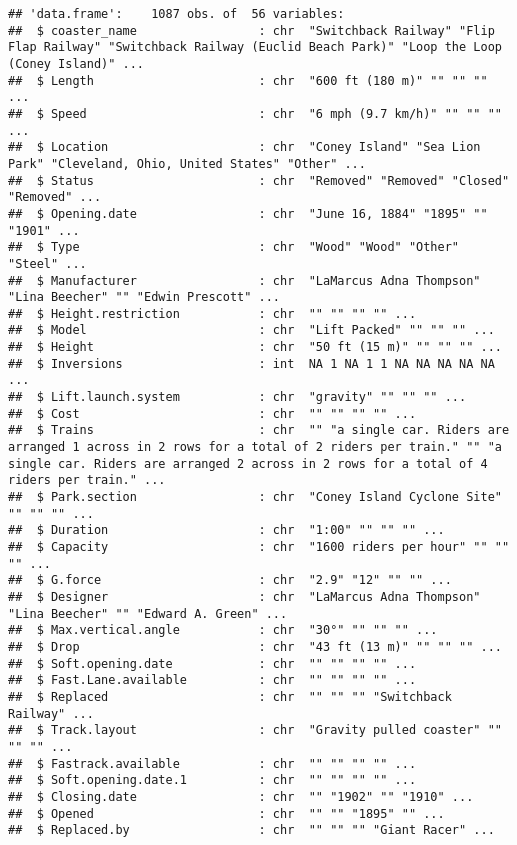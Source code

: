 \documentclass[
]{article}
\begin{document}
\begin{verbatim}
## 'data.frame':    1087 obs. of  56 variables:
##  $ coaster_name                 : chr  "Switchback Railway" "Flip Flap Railway" "Switchback Railway (Euclid Beach Park)" "Loop the Loop (Coney Island)" ...
##  $ Length                       : chr  "600 ft (180 m)" "" "" "" ...
##  $ Speed                        : chr  "6 mph (9.7 km/h)" "" "" "" ...
##  $ Location                     : chr  "Coney Island" "Sea Lion Park" "Cleveland, Ohio, United States" "Other" ...
##  $ Status                       : chr  "Removed" "Removed" "Closed" "Removed" ...
##  $ Opening.date                 : chr  "June 16, 1884" "1895" "" "1901" ...
##  $ Type                         : chr  "Wood" "Wood" "Other" "Steel" ...
##  $ Manufacturer                 : chr  "LaMarcus Adna Thompson" "Lina Beecher" "" "Edwin Prescott" ...
##  $ Height.restriction           : chr  "" "" "" "" ...
##  $ Model                        : chr  "Lift Packed" "" "" "" ...
##  $ Height                       : chr  "50 ft (15 m)" "" "" "" ...
##  $ Inversions                   : int  NA 1 NA 1 1 NA NA NA NA NA ...
##  $ Lift.launch.system           : chr  "gravity" "" "" "" ...
##  $ Cost                         : chr  "" "" "" "" ...
##  $ Trains                       : chr  "" "a single car. Riders are arranged 1 across in 2 rows for a total of 2 riders per train." "" "a single car. Riders are arranged 2 across in 2 rows for a total of 4 riders per train." ...
##  $ Park.section                 : chr  "Coney Island Cyclone Site" "" "" "" ...
##  $ Duration                     : chr  "1:00" "" "" "" ...
##  $ Capacity                     : chr  "1600 riders per hour" "" "" "" ...
##  $ G.force                      : chr  "2.9" "12" "" "" ...
##  $ Designer                     : chr  "LaMarcus Adna Thompson" "Lina Beecher" "" "Edward A. Green" ...
##  $ Max.vertical.angle           : chr  "30°" "" "" "" ...
##  $ Drop                         : chr  "43 ft (13 m)" "" "" "" ...
##  $ Soft.opening.date            : chr  "" "" "" "" ...
##  $ Fast.Lane.available          : chr  "" "" "" "" ...
##  $ Replaced                     : chr  "" "" "" "Switchback Railway" ...
##  $ Track.layout                 : chr  "Gravity pulled coaster" "" "" "" ...
##  $ Fastrack.available           : chr  "" "" "" "" ...
##  $ Soft.opening.date.1          : chr  "" "" "" "" ...
##  $ Closing.date                 : chr  "" "1902" "" "1910" ...
##  $ Opened                       : chr  "" "" "1895" "" ...
##  $ Replaced.by                  : chr  "" "" "" "Giant Racer" ...

\end{verbatim}
\end{document}
